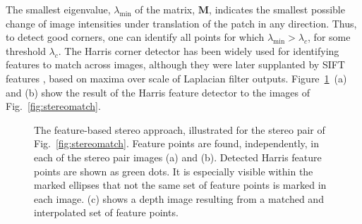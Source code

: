 The smallest eigenvalue, $\lambda_{\mbox{min}}$ of the matrix, $\mathbf{M}$, indicates the smallest possible change of image intensities under translation of the patch in any direction.  Thus, to detect good corners, one can identify all points for which $\lambda_{\mbox{min}} > \lambda_c$, for some threshold $\lambda_c$.
The Harris corner detector has been widely used for identifying features to match across images, although they were later supplanted by SIFT features \cite{Lowe04}, based on maxima over scale of Laplacian filter outputs.  Figure~\ref{fig:stereopoints}~(a) and (b) show the result of the Harris feature detector to the images of Fig.~\ref{fig:stereomatch}.


\begin{figure}
    \centerline{
    }
    \caption{The feature-based stereo approach, illustrated for the stereo pair of Fig.~\ref{fig:stereomatch}.  Feature points are found, independently, in each of the stereo pair images (a) and (b).  Detected Harris feature points \cite{Harris1988} are shown as green dots. It is especially visible within the marked ellipses that not the same set of feature points is marked in each image.  (c) shows a depth image resulting from a matched and interpolated set of feature points.}
    \label{fig:stereopoints}
\end{figure}

